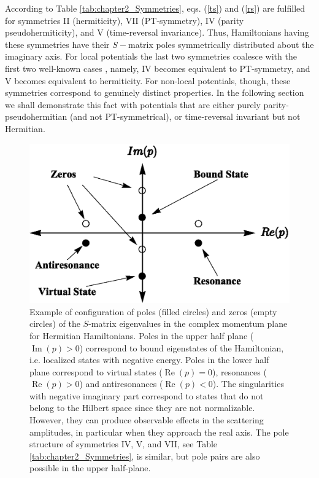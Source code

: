 According to Table \ref{tab:chapter2_Symmetries},  eqs. (\ref{ts}) and (\ref{rs}) are fulfilled
for symmetries  II (hermiticity), VII (PT-symmetry), IV (parity pseudohermiticity),
and V (time-reversal invariance). Thus, Hamiltonians having these symmetries have their $S-$matrix poles symmetrically distributed about the imaginary axis. For local potentials the last two symmetries coalesce with the first two well-known
cases \cite{Ruschhaupt2017}, namely,
IV becomes equivalent to PT-symmetry, and V becomes equivalent to hermiticity. For non-local potentials, though, these symmetries
correspond to genuinely distinct properties. In the following section we shall demonstrate this fact with potentials that are
either purely parity-pseudohermitian (and not PT-symmetrical), or time-reversal invariant but not Hermitian.
%


\begin{figure}[h]
  \centering
  \includegraphics[width=0.5\linewidth]{Figures/DiagramPoles.eps}
  \caption{Example of configuration of poles (filled circles) and zeros (empty circles) of the $S$-matrix eigenvalues in the complex momentum plane for Hermitian Hamiltonians.  Poles in the upper half plane ($\operatorname{Im}(p) > 0$) correspond to bound eigenstates of the Hamiltonian, i.e. localized states with negative energy. Poles in the lower half plane correspond to  virtual states ($\operatorname{Re}(p) = 0$), resonances ($\operatorname{Re}(p) > 0$) and antiresonances ($\operatorname{Re}(p)<0$). The singularities with negative imaginary part correspond to states that do not belong to the Hilbert space since they are not normalizable. However, they can produce observable effects in the scattering amplitudes, in particular when they approach the real axis. The pole structure of symmetries IV, V, and VII, see Table \ref{tab:chapter2_Symmetries},
  is similar, but pole pairs are also possible in the upper half-plane.}
  \label{fig:DiagramPoles}
\end{figure}

